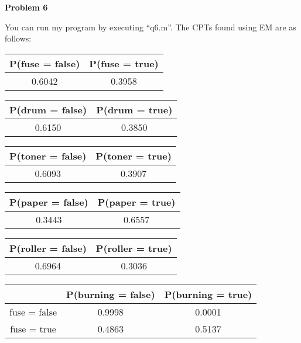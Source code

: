 \textbf{Problem 6}

You can run my program by executing ``q6.m''. The CPTs found using EM are as follows:

\begin{table}[h]
	\begin{tabular}{|c|c|}
		\hline
		P(fuse = false) & P(fuse = true) \\ \hline
		0.6042 & 0.3958 \\ \hline
	\end{tabular}
\end{table}

\begin{table}[h]
	\begin{tabular}{|c|c|}
		\hline
		P(drum = false) & P(drum = true) \\ \hline
		0.6150 & 0.3850 \\ \hline
	\end{tabular}
\end{table}

\begin{table}[h]
	\begin{tabular}{|c|c|}
		\hline
		P(toner = false) & P(toner = true) \\ \hline
		0.6093 & 0.3907 \\ \hline
	\end{tabular}
\end{table}

\begin{table}[h!]
	\begin{tabular}{|c|c|}
		\hline
		P(paper = false) & P(paper = true) \\ \hline
		0.3443 & 0.6557 \\ \hline
	\end{tabular}
\end{table}

\begin{table}[h!]
	\begin{tabular}{|c|c|}
		\hline
		P(roller = false) & P(roller = true) \\ \hline
		0.6964 & 0.3036 \\ \hline
	\end{tabular}
\end{table}

\begin{table}[h!]
	\begin{tabular}{|c|c|c|}
		\hline
		& P(burning = false) & P(burning = true) \\ \hline
		fuse = false & 0.9998 & 0.0001 \\ \hline
		fuse = true & 0.4863 & 0.5137 \\ \hline
	\end{tabular}
\end{table}

